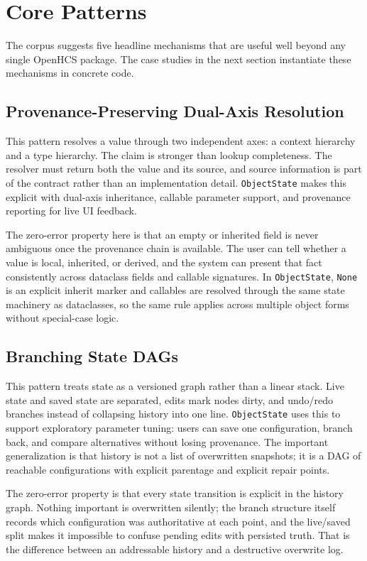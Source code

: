 \section{Core Patterns}

The corpus suggests five headline mechanisms that are useful well beyond any single OpenHCS package. The case studies in the next section instantiate these mechanisms in concrete code.

\subsection{Provenance-Preserving Dual-Axis Resolution}
This pattern resolves a value through two independent axes: a context hierarchy and a type hierarchy. The claim is stronger than lookup completeness. The resolver must return both the value and its source, and source information is part of the contract rather than an implementation detail. \texttt{ObjectState} makes this explicit with dual-axis inheritance, callable parameter support, and provenance reporting for live UI feedback.

The zero-error property here is that an empty or inherited field is never ambiguous once the provenance chain is available. The user can tell whether a value is local, inherited, or derived, and the system can present that fact consistently across dataclass fields and callable signatures. In \texttt{ObjectState}, \texttt{None} is an explicit inherit marker and callables are resolved through the same state machinery as dataclasses, so the same rule applies across multiple object forms without special-case logic.

\subsection{Branching State DAGs}
This pattern treats state as a versioned graph rather than a linear stack. Live state and saved state are separated, edits mark nodes dirty, and undo/redo branches instead of collapsing history into one line. \texttt{ObjectState} uses this to support exploratory parameter tuning: users can save one configuration, branch back, and compare alternatives without losing provenance. The important generalization is that history is not a list of overwritten snapshots; it is a DAG of reachable configurations with explicit parentage and explicit repair points.

The zero-error property is that every state transition is explicit in the history graph. Nothing important is overwritten silently; the branch structure itself records which configuration was authoritative at each point, and the live/saved split makes it impossible to confuse pending edits with persisted truth. That is the difference between an addressable history and a destructive overwrite log.


